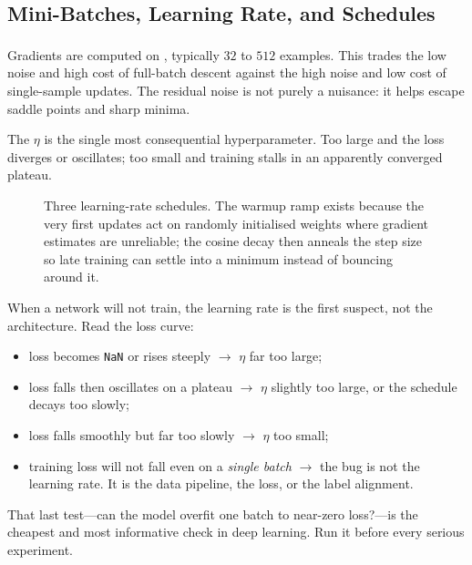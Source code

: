 \subsection{Mini-Batches, Learning Rate, and Schedules}

Gradients are computed on , typically $32$ to $512$
examples\textsuperscript{\cite[][p.~23]{fleuretLittleBookDeep}}. This trades the
low noise and high cost of full-batch descent against the high noise and low
cost of single-sample updates. The residual noise is not purely a nuisance: it
helps escape saddle points and sharp minima.

The  $\eta$ is the single most consequential
hyperparameter. Too large and the loss diverges or oscillates; too small and
training stalls in an apparently converged plateau.

\begin{figure}[htbp]
\centering
{}
\caption{Three learning-rate schedules. The warmup ramp exists because the very
first updates act on randomly initialised weights where gradient estimates are
unreliable; the cosine decay then anneals the step size so late training can
settle into a minimum instead of bouncing around it.}
\label{fig:dl-lr-schedules}
\end{figure}

\begin{cautionbox}
When a network will not train, the learning rate is the first suspect, not the
architecture. Read the loss curve:
\begin{itemize}
  \item loss becomes \texttt{NaN} or rises steeply $\rightarrow$ $\eta$ far too
        large;
  \item loss falls then oscillates on a plateau $\rightarrow$ $\eta$ slightly
        too large, or the schedule decays too slowly;
  \item loss falls smoothly but far too slowly $\rightarrow$ $\eta$ too small;
  \item training loss will not fall even on a \emph{single batch}
        $\rightarrow$ the bug is not the learning rate. It is the data
        pipeline, the loss, or the label alignment.
\end{itemize}
That last test---can the model overfit one batch to near-zero loss?---is the
cheapest and most informative check in deep learning. Run it before every
serious experiment.
\end{cautionbox}

